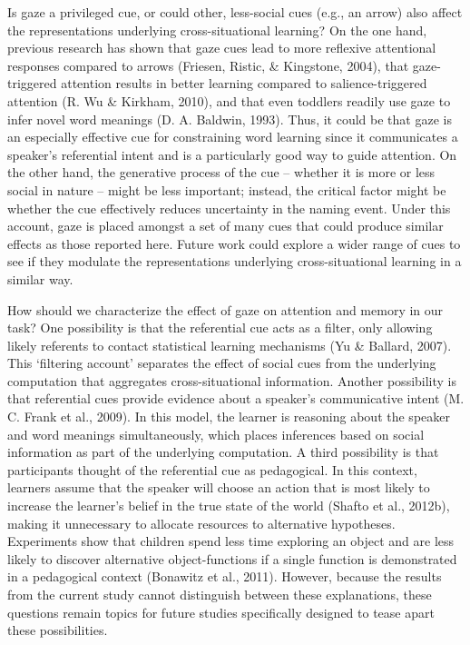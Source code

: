 \documentclass[oneside]{report}
\begin{document}
Is gaze a privileged cue, or could other, less-social cues (e.g., an
arrow) also affect the representations underlying cross-situational
learning? On the one hand, previous research has shown that gaze cues
lead to more reflexive attentional responses compared to arrows
(Friesen, Ristic, \& Kingstone, 2004), that gaze-triggered attention
results in better learning compared to salience-triggered attention (R.
Wu \& Kirkham, 2010), and that even toddlers readily use gaze to infer
novel word meanings (D. A. Baldwin, 1993). Thus, it could be that gaze
is an especially effective cue for constraining word learning since it
communicates a speaker's referential intent and is a particularly good
way to guide attention. On the other hand, the generative process of the
cue -- whether it is more or less social in nature -- might be less
important; instead, the critical factor might be whether the cue
effectively reduces uncertainty in the naming event. Under this account,
gaze is placed amongst a set of many cues that could produce similar
effects as those reported here. Future work could explore a wider range
of cues to see if they modulate the representations underlying
cross-situational learning in a similar way.

How should we characterize the effect of gaze on attention and memory in
our task? One possibility is that the referential cue acts as a filter,
only allowing likely referents to contact statistical learning
mechanisms (Yu \& Ballard, 2007). This `filtering account' separates the
effect of social cues from the underlying computation that aggregates
cross-situational information. Another possibility is that referential
cues provide evidence about a speaker's communicative intent (M. C.
Frank et al., 2009). In this model, the learner is reasoning about the
speaker and word meanings simultaneously, which places inferences based
on social information as part of the underlying computation. A third
possibility is that participants thought of the referential cue as
pedagogical. In this context, learners assume that the speaker will
choose an action that is most likely to increase the learner's belief in
the true state of the world (Shafto et al., 2012b), making it
unnecessary to allocate resources to alternative hypotheses. Experiments
show that children spend less time exploring an object and are less
likely to discover alternative object-functions if a single function is
demonstrated in a pedagogical context (Bonawitz et al., 2011). However,
because the results from the current study cannot distinguish between
these explanations, these questions remain topics for future studies
specifically designed to tease apart these possibilities.
\end{document}
